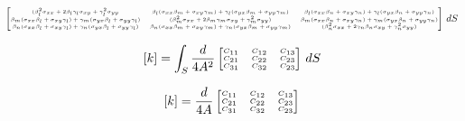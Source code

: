 \documentclass[
12pt,
a4paper,
oneside,
chapter=TITLE,
sumario=tradicional
]{abntex2}
\begin{document}
\begin{equation*}\tiny
	\begin{bmatrix}
		(\beta_l^2\sigma_{xx}+2\beta_l\gamma_l\sigma_{xy}+\gamma_l^2\sigma_{yy} &
		\beta_l(\sigma_{xx}\beta_m+\sigma_{xy}\gamma_m)+\gamma_l(\sigma_{yx}\beta_m+\sigma_{yy}\gamma_m) &
		\beta_l(\sigma_{xx}\beta_n+\sigma_{xy}\gamma_n)+\gamma_l(\sigma_{yx}\beta_n+\sigma_{yy}\gamma_n) \\
		
		\beta_m(\sigma_{xx}\beta_l+\sigma_{xy}\gamma_l)+\gamma_m(\sigma_{yx}\beta_l+\sigma_{yy}\gamma_l) &
		(\beta_m^2\sigma_{xx}+2\beta_m\gamma_m\sigma_{xy}+\gamma_m^2\sigma_{yy}) &
		\beta_m(\sigma_{xx}\beta_n+\sigma_{xy}\gamma_n)+\gamma_m(\sigma_{yx}\beta_n+\sigma_{yy}\gamma_n) \\
		
		\beta_n(\sigma_{xx}\beta_l+\sigma_{xy}\gamma_l)+\gamma_n(\sigma_{yx}\beta_l+\sigma_{yy}\gamma_l) &
		\beta_n(\sigma_{xx}\beta_m+\sigma_{xy}\gamma_m)+\gamma_n(\sigma_{yx}\beta_m+\sigma_{yy}\gamma_m) &
		(\beta_n^2\sigma_{xx}+2\gamma_n\beta_n\sigma_{xy}+\gamma_n^2\sigma_{yy}) 
	\end{bmatrix}
	\, dS
\end{equation*}

\begin{equation*}\tiny
	[k] = \int_S \frac{d}{4A^2}
	\begin{bmatrix}
		C_{11} & C_{12} & C_{13} \\
		C_{21} & C_{22} & C_{23} \\
		C_{31} & C_{32} & C_{23} 
	\end{bmatrix}
	\, dS
\end{equation*}

\begin{equation*}\tiny
	[k] = \frac{d}{4A}
	\begin{bmatrix}
		C_{11} & C_{12} & C_{13} \\
		C_{21} & C_{22} & C_{23} \\
		C_{31} & C_{32} & C_{23} 
	\end{bmatrix}
\end{equation*}
\end{document}
